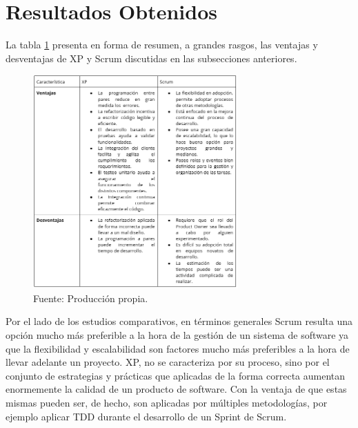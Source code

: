 \documentclass[a4paper,10pt]{article}
\begin{document}
	\section{Resultados Obtenidos}
	La tabla \ref{tabla_ventajas_desventajas} presenta en forma de resumen, a grandes rasgos, las ventajas y desventajas de XP y Scrum discutidas en las subsecciones anteriores.
	\begin{figure}[h]
		\centering
		\includegraphics[width=0.7\textwidth]{tablaVentajasDesventajas.PNG}
		\caption{Fuente: Producción propia.}
		\label{tabla_ventajas_desventajas}
	\end{figure}\newline
	Por el lado de los estudios comparativos, en términos generales Scrum resulta una opción mucho más preferible a la hora de la gestión de un sistema de software ya que la flexibilidad y escalabilidad son factores mucho más preferibles a la hora de llevar adelante un proyecto. XP, no se caracteriza por su proceso, sino por el conjunto de estrategias y prácticas que aplicadas de la forma correcta aumentan enormemente la calidad de un producto de software. Con la ventaja de que estas mismas pueden ser, de hecho, son aplicadas por múltiples metodologías, por ejemplo aplicar TDD durante el desarrollo de un Sprint de Scrum.
\end{document}
